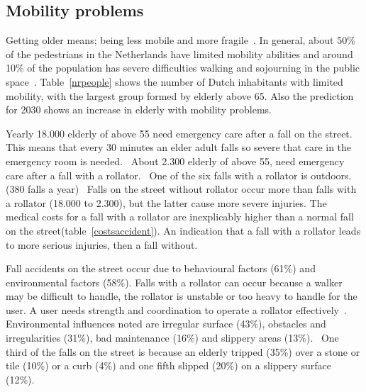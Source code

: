 \subsection{Mobility problems}
Getting older means; being less mobile and more fragile~\cite{VeiligheidNL2012}. In general, about 50\% of the pedestrians in the Netherlands have limited mobility abilities and around 10\% of the population has severe difficulties walking and sojourning in the public space~\cite{Sauter2010}. Table~\ref{nrpeople} shows the number of Dutch inhabitants with limited mobility, with the largest group formed by elderly above 65. Also the prediction for 2030 shows an increase in elderly with mobility problems.~\cite{Sauter2010} 

Yearly 18.000 elderly of above 55 need emergency care after a fall on the street. This means that every 30 minutes an elder adult falls so severe that care in the emergency room is needed.~\cite{VeiligheidNL2012} About 2.300 elderly of above 55, need emergency care after a fall with a rollator.~\cite{VeiligheidNL2012} One of the six falls with a rollator is outdoors. (380 falls a year)~\cite{VeiligheidNL2012} Falls on the street without rollator occur more than falls with a rollator (18.000 to 2.300), but the latter cause more severe injuries. The medical costs for a fall with a rollator are inexplicably higher than a normal fall on the street(table~\ref{costsaccident}). An indication that a fall with a rollator leads to more serious injuries, then a fall without.~\cite{VeiligheidNL2012}

Fall accidents on the street occur due to behavioural factors (61\%) and environmental factors (58\%). Falls with a rollator can occur because a walker may be difficult to handle, the rollator is unstable or too heavy to handle for the user. A user needs strength and coordination to operate a rollator effectively~\cite{Einbinder2010, Weiss2014}. Environmental influences noted are irregular surface (43\%), obstacles and irregularities (31\%), bad maintenance (16\%) and slippery areas (13\%).~\cite{VeiligheidNL2012} One third of the falls on the street is because an elderly tripped (35\%) over a stone or tile (10\%) or a curb (4\%) and one fifth slipped (20\%) on a slippery surface (12\%).~\cite{VeiligheidNL2012} 

\renewcommand{\arraystretch}{1.5}

